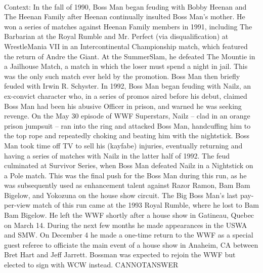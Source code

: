 \documentclass[11pt,a4paper, onecolumn]{article}
\begin{document}
\\ Context: In the fall of 1990, Boss Man began feuding with Bobby Heenan and The Heenan Family after Heenan continually insulted Boss Man's mother. He won a series of matches against Heenan Family members in 1991, including The Barbarian at the Royal Rumble and Mr. Perfect (via disqualification) at WrestleMania VII in an Intercontinental Championship match, which featured the return of Andre the Giant. At the SummerSlam, he defeated The Mountie in a Jailhouse Match, a match in which the loser must spend a night in jail. This was the only such match ever held by the promotion. Boss Man then briefly feuded with Irwin R. Schyster. In 1992, Boss Man began feuding with Nailz, an ex-convict character who, in a series of promos aired before his debut, claimed Boss Man had been his abusive Officer in prison, and warned he was seeking revenge. On the May 30 episode of WWF Superstars, Nailz -- clad in an orange prison jumpsuit -- ran into the ring and attacked Boss Man, handcuffing him to the top rope and repeatedly choking and beating him with the nightstick. Boss Man took time off TV to sell his (kayfabe) injuries, eventually returning and having a series of matches with Nailz in the latter half of 1992. The feud culminated at Survivor Series, when Boss Man defeated Nailz in a Nightstick on a Pole match. This was the final push for the Boss Man during this run, as he was subsequently used as enhancement talent against Razor Ramon, Bam Bam Bigelow, and Yokozuna on the house show circuit. The Big Boss Man's last pay-per-view match of this run came at the 1993 Royal Rumble, where he lost to Bam Bam Bigelow. He left the WWF shortly after a house show in Gatineau, Quebec on March 14. During the next few months he made appearances in the USWA and SMW. On December 4 he made a one-time return to the WWF as a special guest referee to officiate the main event of a house show in Anaheim, CA between Bret Hart and Jeff Jarrett. Bossman was expected to rejoin the WWF but elected to sign with WCW instead. CANNOTANSWER
\end{document}
